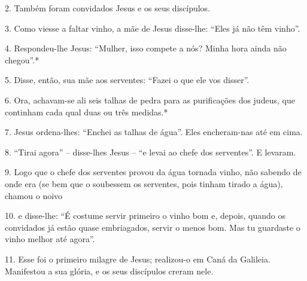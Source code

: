 \documentclass[10pt,a5]{article}
\begin{document}
\begin{paracol}{2}
2.
Também foram convidados Jesus e os seus discípulos.

3.
Como viesse a faltar vinho, a mãe de Jesus disse-lhe: “Eles já não têm vinho”.

4.
Respondeu-lhe Jesus: “Mulher, isso compete a nós? Minha hora ainda não chegou”.*

5.
Disse, então, sua mãe aos serventes: “Fazei o que ele vos disser”.

6.
Ora, achavam-se ali seis talhas de pedra para as purificações dos judeus, que continham cada qual duas ou três medidas.*

7.
Jesus ordena-lhes: “Enchei as talhas de água”. Eles encheram-nas até em cima.

8.
“Tirai agora” – disse-lhes Jesus – “e levai ao chefe dos serventes”. E levaram.

9.
Logo que o chefe dos serventes provou da água tornada vinho, não sabendo de onde era (se bem que o soubessem os serventes, pois tinham tirado a água), chamou o noivo

10.
e disse-lhe: “É costume servir primeiro o vinho bom e, depois, quando os convidados já estão quase embriagados, servir o menos bom. Mas tu guardaste o vinho me­lhor até agora”.

11.
Esse foi o primeiro milagre de Jesus; realizou-o em Caná da Galileia. Manifestou a sua glória, e os seus discípulos creram nele.



 \switchcolumn*

\end{paracol}

 \clearpage
\end{document}
